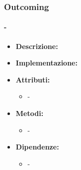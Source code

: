 \subsubsection{Outcoming}

\paragraph{-}

\begin{itemize}
    \item \textbf{Descrizione:} 
    \item \textbf{Implementazione:} 
    \item \textbf{Attributi:}
    \begin{itemize}
        \item -
    \end{itemize}
    \item \textbf{Metodi:}
    \begin{itemize}
        \item -
    \end{itemize}
    \item \textbf{Dipendenze:}
    \begin{itemize}
        \item -
    \end{itemize}
\end{itemize}  